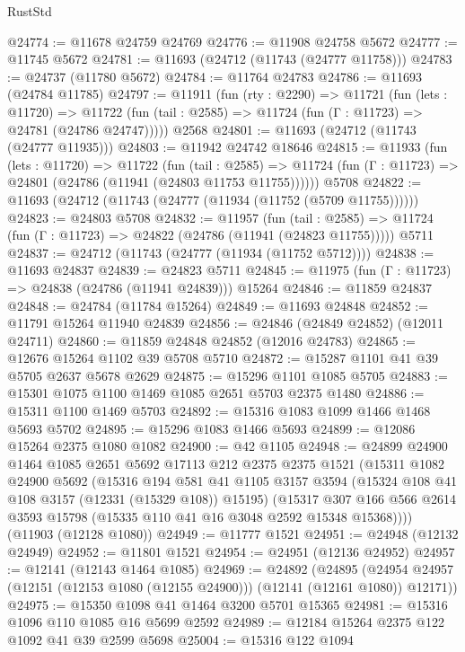 \begin{lexlean}{RustStd}
\begin{coremodule}
@24774 := @11678 @24759 @24769
@24776 := @11908 @24758 @5672
@24777 := @11745 @5672
@24781 := @11693 (@24712 (@11743 (@24777 @11758)))
@24783 := @24737 (@11780 @5672)
@24784 := @11764 @24783
@24786 := @11693 (@24784 @11785)
@24797 := @11911
    (fun (rty : @2290) =>
    @11721
      (fun (lets : @11720) =>
      @11722 (fun (tail : @2585) => @11724 (fun (Γ : @11723) => @24781 (@24786 @24747)))))
    @2568
@24801 := @11693 (@24712 (@11743 (@24777 @11935)))
@24803 := @11942 @24742 @18646
@24815 := @11933
    (fun (lets : @11720) =>
    @11722
      (fun (tail : @2585) =>
      @11724 (fun (Γ : @11723) => @24801 (@24786 (@11941 (@24803 @11753 @11755))))))
    @5708
@24822 := @11693 (@24712 (@11743 (@24777 (@11934 (@11752 (@5709 @11755))))))
@24823 := @24803 @5708
@24832 := @11957
    (fun (tail : @2585) => @11724 (fun (Γ : @11723) => @24822 (@24786 (@11941 (@24823 @11755)))))
    @5711
@24837 := @24712 (@11743 (@24777 (@11934 (@11752 @5712))))
@24838 := @11693 @24837
@24839 := @24823 @5711
@24845 := @11975 (fun (Γ : @11723) => @24838 (@24786 (@11941 @24839))) @15264
@24846 := @11859 @24837
@24848 := @24784 (@11784 @15264)
@24849 := @11693 @24848
@24852 := @11791 @15264 @11940 @24839
@24856 := @24846 (@24849 @24852) (@12011 @24711)
@24860 := @11859 @24848 @24852 (@12016 @24783)
@24865 := @12676 @15264 @1102 @39 @5708 @5710
@24872 := @15287 @1101 @41 @39 @5705 @2637 @5678 @2629
@24875 := @15296 @1101 @1085 @5705
@24883 := @15301 @1075 @1100 @1469 @1085 @2651 @5703 @2375 @1480
@24886 := @15311 @1100 @1469 @5703
@24892 := @15316 @1083 @1099 @1466 @1468 @5693 @5702
@24895 := @15296 @1083 @1466 @5693
@24899 := @12086 @15264 @2375 @1080 @1082
@24900 := @42 @1105
@24948 := @24899
    @24900
    @1464
    @1085
    @2651
    @5692
    @17113
    @212
    @2375
    @2375
    @1521
    (@15311
      @1082
      @24900
      @5692
      (@15316
        @194
        @581
        @41
        @1105
        @3157
        @3594
        (@15324 @108 @41 @108 @3157 (@12331 (@15329 @108)) @15195)
        (@15317 @307 @166 @566 @2614 @3593 @15798 (@15335 @110 @41 @16 @3048 @2592 @15348 @15368))))
    (@11903 (@12128 @1080))
@24949 := @11777 @1521
@24951 := @24948 (@12132 @24949)
@24952 := @11801 @1521
@24954 := @24951 (@12136 @24952)
@24957 := @12141 (@12143 @1464 @1085)
@24969 := @24892
    (@24895 (@24954 @24957 (@12151 (@12153 @1080 (@12155 @24900))) (@12141 (@12161 @1080)) @12171))
@24975 := @15350 @1098 @41 @1464 @3200 @5701 @15365
@24981 := @15316 @1096 @110 @1085 @16 @5699 @2592
@24989 := @12184 @15264 @2375 @122 @1092 @41 @39 @2599 @5698
@25004 := @15316
    @122
    @1094

\end{coremodule}
\end{lexlean}

